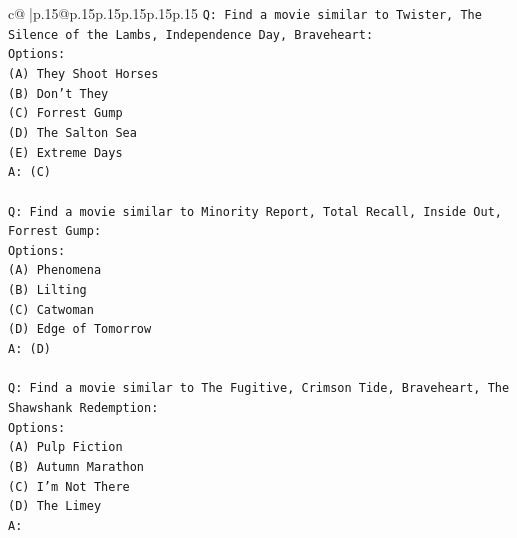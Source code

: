 \documentclass{article}
\begin{document}
{\begin{supertabular}{c@{$\;$}|p{.15\linewidth}@{}p{.15\linewidth}p{.15\linewidth}p{.15\linewidth}p{.15\linewidth}p{.15\linewidth}}
{{{\texttt{Q: Find a movie similar to Twister, The Silence of the Lambs, Independence Day, Braveheart:} \\
\texttt{Options:} \\
\texttt{(A) They Shoot Horses} \\
\texttt{(B) Don't They} \\
\texttt{(C) Forrest Gump} \\
\texttt{(D) The Salton Sea} \\
\texttt{(E) Extreme Days} \\
\texttt{A: (C)} \\
\\ 
\texttt{Q: Find a movie similar to Minority Report, Total Recall, Inside Out, Forrest Gump:} \\
\texttt{Options:} \\
\texttt{(A) Phenomena} \\
\texttt{(B) Lilting} \\
\texttt{(C) Catwoman} \\
\texttt{(D) Edge of Tomorrow} \\
\texttt{A: (D)} \\
\\ 
\texttt{Q: Find a movie similar to The Fugitive, Crimson Tide, Braveheart, The Shawshank Redemption:} \\
\texttt{Options:} \\
\texttt{(A) Pulp Fiction} \\
\texttt{(B) Autumn Marathon} \\
\texttt{(C) I'm Not There} \\
\texttt{(D) The Limey} \\
\texttt{A:} \\
            }
        }
    }
     \\ \\


\end{supertabular}}
\end{document}
